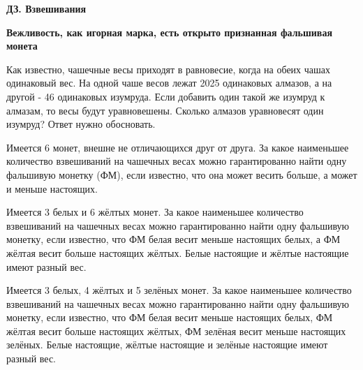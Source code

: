 \centerline{\bf \Huge ДЗ. Взвешивания}
\centerline{\bf \Huge }

\begin{flushright}
        \scriptsize{\textbf{Вежливость, как игорная марка, есть открыто признанная фальшивая монета}}
\end{flushright}

 Как известно, чашечные весы приходят в равновесие, когда на обеих чашах одинаковый вес. На одной чаше весов лежат 2025 одинаковых алмазов, а на другой - 46 одинаковых изумруда. Если добавить один такой же изумруд к алмазам, то весы будут уравновешены. Сколько алмазов уравновесят один изумруд? Ответ нужно обосновать.

 Имеется 6 монет, внешне не отличающихся друг от друга. За какое наименьшее количество взвешиваний на чашечных весах можно гарантированно найти одну фальшивую монетку (ФМ), если известно, что она может весить больше, а может и меньше настоящих.

 Имеется 3 белых и 6 жёлтых монет. За какое наименьшее количество взвешиваний на чашечных весах можно гарантированно найти одну фальшивую монетку, если известно, что ФМ белая весит меньше настоящих белых, а ФМ жёлтая весит больше настоящих жёлтых. Белые настоящие и жёлтые настоящие имеют разный вес.

 Имеется 3 белых, 4 жёлтых и 5 зелёных монет. За какое наименьшее количество взвешиваний на чашечных весах можно гарантированно найти одну фальшивую монетку, если известно, что ФМ белая весит меньше настоящих белых, ФМ жёлтая весит больше настоящих жёлтых, ФМ зелёная весит меньше настоящих зелёных. Белые настоящие, жёлтые настоящие и зелёные настоящие имеют разный вес.


